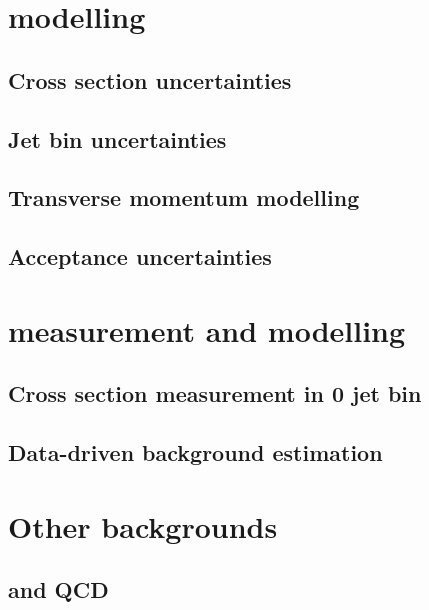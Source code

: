 \documentclass[hyper,linkcolor=blue]{mythesis}
\begin{document}
\begin{mainmatter}
  \chapter{\ggH modelling}
    \label{chap:signal}
    
    \section{Cross section uncertainties}
      \label{sec:ggf_xs}
      
    \section{Jet bin uncertainties}
      \label{sec:ggf_jetbin}
      
    \section{Transverse momentum modelling}
      \label{sec:ggf_pt}
      
    \section{Acceptance uncertainties}
      \label{sec:ggf_acc}
      

  \chapter{\WW measurement and modelling}
    \label{chap:ww}
    
    \section{Cross section measurement in 0 jet bin}
      \label{sec:ww_meas}
      
    \section{Data-driven background estimation}
      \label{sec:ww_bkg}
      

  \chapter{Other backgrounds}
    \label{chap:backgrounds}
    
    \section{\Wjets and QCD}
      \label{sec:wjets}
      

\end{mainmatter}
\end{document}
